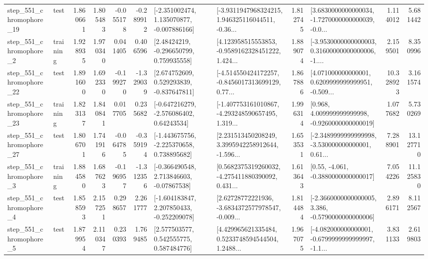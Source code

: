 \begin{tabular}{llrrrrllrlrr}
  step\_551\_chromophore\_19 &      test &      1.860661 &    1.805483 &     -0.055178 & -0.289912 &   [-2.351002474, 1.135070877, -0.007886166] &  [-3.9311947968324215, 1.946325116044511, -0.36... &       1.812745 &  [3.6830000000000034, -1.7270000000000039, -0.0... &            1.114012 &          5.681442 \\
   step\_551\_chromophore\_2 &  training &      1.928935 &    1.970340 &      0.041405 &  0.406596 &     [2.48424219, -0.296650799, 0.759935558] &  [4.123958515553853, -0.9589162328451222, 1.424... &       1.889074 &  [-3.9530000000000003, 0.31600000000000006, -1.... &            2.159501 &          8.350996 \\
  step\_551\_chromophore\_22 &      test &      1.891600 &    1.692330 &     -0.199270 & -1.329039 &    [2.674752609, 0.529293839, -0.837647811] &  [-4.514550424172257, -0.8456017313699129, 0.77... &       1.867886 &  [4.071000000000001, 0.6209999999999951, -0.509... &           10.328923 &          3.161574 \\
  step\_551\_chromophore\_23 &  training &      1.823137 &    1.840841 &      0.017705 &  0.235682 &    [-0.647216279, -2.576086402, 0.64243534] &  [-1.407753161010867, -4.293248590657495, 1.319... &       1.996314 &    [0.968, 4.009999999999998, -0.9260000000000019] &            1.077682 &          5.730269 \\
  step\_551\_chromophore\_27 &      test &      1.806701 &    1.741916 &     -0.064785 & -0.359194 &   [-1.443675756, -2.225370658, 0.738895682] &  [2.231513450208249, 3.3995942258912644, -1.596... &       1.653531 &  [-2.3489999999999998, -3.530000000000001, 0.61... &            7.288901 &         13.127710 \\
   step\_551\_chromophore\_3 &  training &      1.884580 &    1.687623 &     -0.196957 & -1.312356 &    [-0.366490548, 2.713846603, -0.07867538] &  [0.5682375319260032, -4.275411880390092, 0.431... &       1.613643 &                [0.55, -4.061, -0.3880000000000017] &            7.054226 &         11.125830 \\
   step\_551\_chromophore\_4 &      test &      1.858593 &    2.157251 &      0.298657 &  2.261777 &   [-1.604183847, 2.207850433, -0.252209078] &  [2.62728772221936, -3.6834372577978547, -0.009... &       1.814484 &  [-2.3660000000000005, 3.386, -0.5790000000000006] &            2.896171 &          8.112567 \\
   step\_551\_chromophore\_5 &      test &      1.879954 &    2.110347 &      0.230393 &  1.769485 &     [2.577503577, 0.542555775, 0.587484776] &  [4.429965621335484, 0.5233748594544504, 1.2488... &       1.967075 &  [-4.082000000000001, -0.6799999999999997, -1.1... &            3.831133 &          2.619803 \\

\end{tabular}
